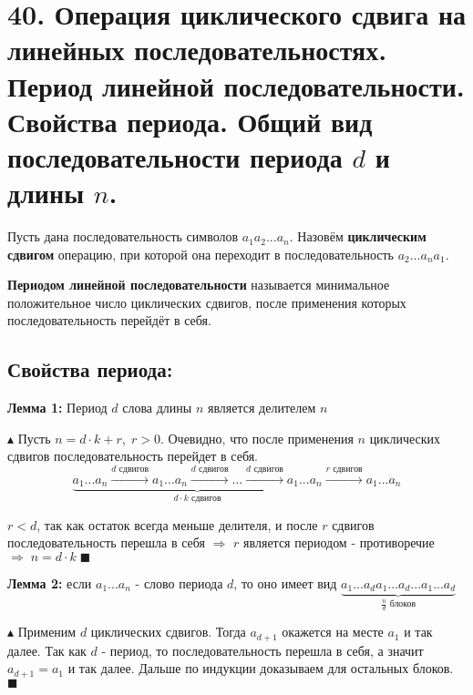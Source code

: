 \section*{40. Операция циклического сдвига на линейных последовательностях. Период линейной последовательности. Свойства периода. Общий вид последовательности периода $d$ и длины $n$.}
\par Пусть дана последовательность символов $a_1 a_2 ... a_n$. Назовём \textbf{циклическим сдвигом} операцию, при которой она переходит в последовательность $a_2 ... a_n a_1$.
\par \textbf{Периодом линейной последовательности} называется минимальное положительное число циклических сдвигов, после применения которых последовательность перейдёт в себя.
\subsection*{Свойства периода:}
\par \textbf{Лемма 1:} Период $d$ слова длины $n$ является делителем $n$
\par $\blacktriangle$ Пусть $n=d \cdot k+r, \; r>0$. Очевидно, что после применения $n$ циклических сдвигов последовательность перейдет в себя. $$\underbrace{a_1...a_n \xrightarrow{d \text{ сдвигов}} a_1...a_n \xrightarrow{d \text{ сдвигов}} ... \xrightarrow{d \text{ сдвигов}} a_1...a_n}_{d \cdot k \text{ сдвигов}}\xrightarrow{r \text{ сдвигов}} a_1...a_n$$
\par $r < d$, так как остаток всегда меньше делителя, и после $r$ сдвигов последовательность перешла в себя $\Rightarrow$ $r$ является периодом - противоречие $\Rightarrow \; n=d \cdot k \; \blacksquare$
\par \textbf{Лемма 2:} если $a_1...a_n$ - слово периода $d$, то оно имеет вид $\underbrace{a_1...a_da_1...a_d...a_1...a_d}_{\frac{n}{d} \text{ блоков}}$
\par $\blacktriangle$ Применим $d$ циклических сдвигов. Тогда $a_{d+1}$ окажется на месте $a_1$ и так далее. Так как $d$ - период, то последовательность перешла в себя, а значит $a_{d+1}=a_1$ и так далее. Дальше по индукции доказываем для остальных блоков. $\blacksquare$

